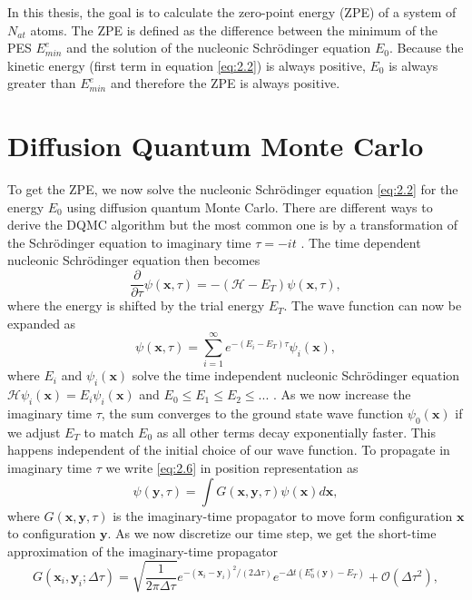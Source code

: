\documentclass [12pt]{report}
\begin{document}
In this thesis, the goal is to calculate the zero-point energy (ZPE) of a system of $N_{at}$ atoms. The ZPE is defined as the difference between the minimum of the PES $E_{min}^e$ and the solution of the nucleonic Schrödinger equation $E_0$. Because the kinetic energy (first term in equation \eqref{eq:2.2}) is always positive, $E_0$ is always greater than $E_{min}^e$ and therefore the ZPE is always positive.

\section{Diffusion Quantum Monte Carlo}
To get the ZPE, we now solve the nucleonic Schrödinger equation \eqref{eq:2.2} for the energy $E_0$ using diffusion quantum Monte Carlo. There are different ways to derive the DQMC algorithm but the most common one is by a transformation of the Schrödinger equation to imaginary time $\tau = -it$ \cite{mccoy,cyrus,herleitung2}. The time dependent nucleonic Schrödinger equation then becomes
\begin{equation} \label{eq:2.5}
\frac{\partial}{\partial \tau} \psi(\bm{x},\tau) = -(\mathcal{H} - E_T) \psi(\bm{x},\tau),
\end{equation}
where the energy is shifted by the trial energy $E_T$. The wave function can now be expanded as
\begin{equation} \label{eq:2.6}
\psi(\bm{x},\tau) = \sum_{i=1}^{\infty} e^{-(E_i - E_T)\tau}\psi_i(\bm{x}),
\end{equation}
where $E_i$ and $\psi_i(\bm{x})$ solve the time independent nucleonic Schrödinger equation $\mathcal{H}\psi_i(\bm{x}) = E_i \psi_i(\bm{x})$ and $E_0 \leq E_1 \leq E_2 \leq...$ .
As we now increase the imaginary time $\tau$, the sum converges to the ground state wave function $\psi_0(\bm{x})$ if we adjust $E_T$ to match $E_0$ as all other terms decay exponentially faster. This happens independent of the initial choice of our wave function.
To propagate in imaginary time $\tau$ we write \eqref{eq:2.6} in position representation as
\begin{equation} \label{propagate}
\psi(\bm{y},\tau) = \int G(\bm{x},\bm{y},\tau) \psi(\bm{x}) d \bm{x},
\end{equation}
where $G(\bm{x},\bm{y},\tau)$ is the imaginary-time propagator to move form configuration $\bm{x}$ to configuration $\bm{y}$. 
As we now discretize our time step, we get the short-time approximation of the imaginary-time  propagator 
\begin{equation} \label{eq:2.7}
G(\bm{x}_i,\bm{y}_i;\Delta \tau) = \sqrt{\frac{1}{2 \pi \Delta \tau}} e^{-(\bm{x}_i-\bm{y}_i)^2 /(2 \Delta \tau)} e^{-\Delta t (E_0^e(\bm{y}) - E_T)} + \mathcal{O}(\Delta \tau^2),
\end{equation}
\end{document}
